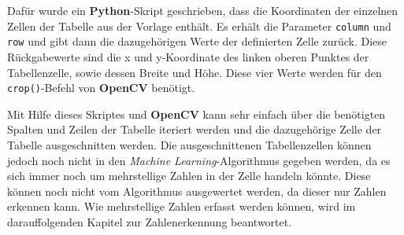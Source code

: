 Dafür wurde ein \textbf{Python}-Skript geschrieben, dass die Koordinaten der einzelnen Zellen der Tabelle aus der Vorlage enthält. Es erhält die Parameter \texttt{column} 
und \texttt{row} und gibt dann die dazugehörigen Werte der definierten Zelle zurück. Diese Rückgabewerte sind die x und y-Koordinate des linken oberen Punktes der
Tabellenzelle, sowie dessen Breite und Höhe. Diese vier Werte werden für den \texttt{crop()}-Befehl von \textbf{OpenCV} benötigt.

Mit Hilfe dieses Skriptes und \textbf{OpenCV} kann sehr einfach über die benötigten Spalten und Zeilen der Tabelle iteriert werden und die dazugehörige Zelle der 
Tabelle ausgeschnitten werden. Die ausgeschnittenen Tabellenzellen können jedoch noch nicht in den \textit{Machine Learning}-Algorithmus gegeben werden, da es sich immer
noch um mehrstellige Zahlen in der Zelle handeln könnte. Diese können noch nicht vom Algorithmus ausgewertet werden, da dieser nur Zahlen erkennen kann.
Wie mehrstellige Zahlen erfasst werden können, wird im darauffolgenden Kapitel zur Zahlenerkennung beantwortet.
